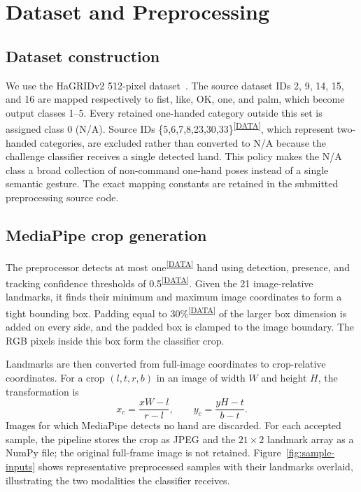 \documentclass[10pt,twocolumn,a4paper]{article}
\newcommand{\evidence}[1]{\textsuperscript{\scriptsize[\hyperref[ev:#1]{#1}]}}
\newcommand{\result}[2]{#1\evidence{#2}}
\begin{document}
\section{Dataset and Preprocessing}
\label{sec:data}

\subsection{Dataset construction}

We use the HaGRIDv2 512-pixel dataset~\cite{nuzhdin2024hagridv2}. The source
dataset IDs 2, 9, 14, 15, and 16 are mapped respectively to fist, like, OK,
one, and palm, which become output classes 1--5. Every retained one-handed
category outside this set is assigned class 0 (N/A). Source IDs
\result{\{5,6,7,8,23,30,33\}}{DATA}, which represent two-handed categories,
are excluded rather than converted to N/A because the challenge classifier
receives a single detected hand. This policy makes the N/A class a broad
collection of non-command one-hand poses instead of a single semantic
gesture. The exact mapping constants are retained in
the submitted preprocessing source code.

\subsection{MediaPipe crop generation}

The preprocessor detects at most \result{one}{DATA} hand using detection,
presence, and tracking confidence thresholds of \result{0.5}{DATA}. Given the
21 image-relative landmarks, it finds their minimum and maximum image
coordinates to form a tight bounding box. Padding equal to
\result{30\%}{DATA} of the larger box dimension is added on every side, and
the padded box is clamped to the image boundary. The RGB pixels inside this
box form the classifier crop.

Landmarks are then converted from full-image coordinates to crop-relative
coordinates. For a crop $(l,t,r,b)$ in an image of width $W$ and height $H$,
the transformation is
\begin{equation}
x_c=\frac{xW-l}{r-l}, \qquad y_c=\frac{yH-t}{b-t}.
\end{equation}
Images for which MediaPipe detects no hand are discarded. For each accepted
sample, the pipeline stores the crop as JPEG and the $21\times2$ landmark
array as a NumPy file; the original full-frame image is not retained.
Figure~\ref{fig:sample-inputs} shows representative preprocessed samples with
their landmarks overlaid, illustrating the two modalities the classifier
receives.
\end{document}

